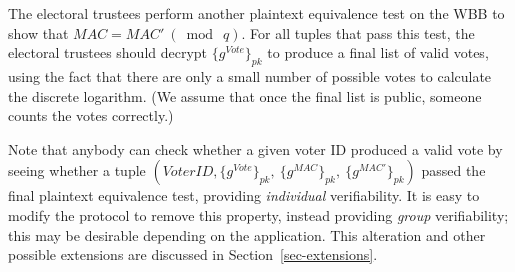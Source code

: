 \documentclass[12pt,a4paper]{article}
\theoremstyle{definition}
\newcommand{\Vote}{\mathit{Vote}}
\newcommand{\VoterID}{\mathit{VoterID}}
\newcommand{\Mac}{\mathit{MAC}}
\begin{document}
The electoral trustees perform another plaintext equivalence test on the WBB to show that $\Mac=\Mac'\ (\bmod\ q)$. For all tuples that pass this test, the electoral trustees should decrypt $\{g^\Vote\}_{pk}$ to produce a final list of valid votes, using the fact that there are only a small number of possible votes to calculate the discrete logarithm. (We assume that once the final list is public, someone counts the votes correctly.)

Note that anybody can check whether a given voter ID produced a valid vote by seeing whether a tuple $\left(\VoterID, \{g^{\Vote}\}_{pk},\ \{g^{\Mac}\}_{pk},\ \{g^{\Mac'}\}_{pk}\right)$ passed the final plaintext equivalence test, providing \textit{individual} verifiability. It is easy to modify the protocol to remove this property, instead providing \textit{group} verifiability; this may be desirable depending on the application. This alteration and other possible extensions are discussed in Section~\ref{sec-extensions}.
\end{document}
